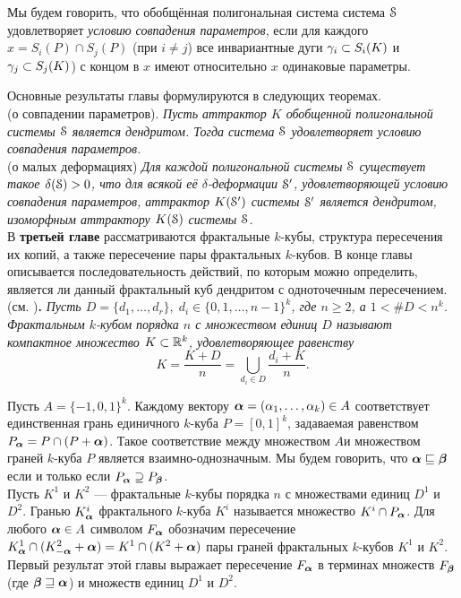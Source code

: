 Мы будем говорить, что обобщённая полигональная система система ${\EuScript S}$ удовлетворяет {\em условию совпадения параметров}, если для каждого \linebreak $x=S_i(P)\cap S_j(P)$ (при $i\neq j$) все инвариантные дуги $\gamma_i\subset S_i(K)$ и $\gamma_j\subset S_j(K)$) с концом в $x$ имеют относительно $x$ одинаковые параметры.

Основные результаты главы формулируются в следующих теоремах.\\

 (о совпадении параметров). 
{\em
Пусть аттрактор $K$ обобщенной полигональной системы ${\EuScript S}$ является дендритом. 
Тогда система ${\EuScript S}$ удовлетворяет условию совпадения параметров.}\\

 (о малых деформациях)
{\em Для каждой полигональной системы ${\EuScript S}$ существует такое $\delta({\EuScript S}) > 0$, что для всякой её $\delta$-деформации ${\EuScript S}'$, удовлетворяющей условию совпадения параметров, аттрактор $K({\EuScript S}')$ системы ${\EuScript S}'$ является дендритом, изоморфным аттрактору $K({\EuScript S})$ системы ${\EuScript S}$.}\\



В {\bf третьей главе} рассматриваются фрактальные $k$-кубы, структура пересечения их копий, а также пересечение пары фрактальных $k$-кубов. 
В конце главы описывается последовательность действий, по которым можно определить, является ли данный фрактальный куб дендритом с одноточечным пересечением.\\

 (см. \cite{Olsen1998,LLR2013}){\bf.}
{\em Пусть  $D=\{d_1,\ldots,d_r\},\; d_i\in\{0,1,\ldots,n-1\}^k$, где $n\ge 2$, а $1<\#D<n^k$.
{\em Фрактальным $k$-кубом порядка $n$ с множеством единиц $D$} называют компактное множество $K\subset\mathbb{R}^k$, удовлетворяющее равенству
$$K=\dfrac{K+D}{n}=\bigcup_{d_i\in D}\dfrac{d_i+K}{n}.$$}


Пусть $A=\{-1,0,1\}^k$. 
Каждому вектору ${\bm{\alpha}}=(\alpha_1,\ldots,\alpha_k)\in A$ соответствует единственная грань единичного $k$-куба $P=[0,1]^k$, задаваемая равенством $P_{\bm{\alpha}}=P\cap(P+{\bm{\alpha}})$.
Такое соответствие между множеством $A$и множеством граней $k$-куба $P$ является взаимно-однозначным.
Мы будем говорить, что ${\bm{\alpha}}\sqsubseteq{\bm{\beta}}$ если и только если $P_{\bm{\alpha}}\supseteq P_{\bm{\beta}}$.\\


Пусть $K^1$ и $K^2$ --- фрактальные $k$-кубы порядка $n$ с множествами единиц $D^1$ и $D^2$.
Гранью $K_{\bm{\alpha}}^i$ фрактального $k$-куба $K^i$ называется множество $K^i\cap P_{\bm{\alpha}}$.
Для любого ${\bm{\alpha}}\in A$ символом $F_{\bm{\alpha}}$ обозначим пересечение $K^1_{\bm{\alpha}}\cap(K^2_{-{\bm{\alpha}}}+{\bm{\alpha}})=K^1\cap(K^2+{\bm{\alpha}})$ пары граней фрактальных $k$-кубов $K^1$ и $K^2$.
Первый результат этой главы выражает пересечение $F_{\bm{\alpha}}$ в терминах множеств $F_{\bm{\beta}}$ (где ${\bm{\beta}}\sqsupseteq{\bm{\alpha}}$) и множеств единиц $D^1$ и $D^2$.\\

